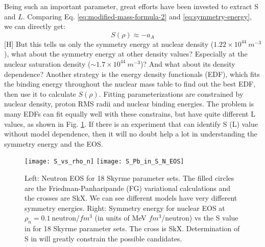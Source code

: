 Being such an important parameter, great efforts have been invested to extract S 
and $L$. Comparing Eq. \ref{eq:modified-mass-formula-2} and \ref{eq:symmetry-energy},
we can directly get:
\begin{equation}
    S(\rho) \approx -a_A
\end{equation}[H]
But this tells us only the symmetry energy at nuclear density ($1.22 \times 10^{44}\ m^{-3}$),
what about the symmetry energy at other density values? Especially at the nuclear
saturation density ($\sim 1.7 \times 10^{44}\ m^{-3}$)? And what about its density
dependence? Another strategy is the energy density functionals (EDF), which fits
the binding energy throughout the nuclear mass table to find out the best EDF,
then use it to calculate $S(\rho)$. Fitting parameterizations are constrained
by nuclear density, proton RMS radii and nuclear binding energies. 
The problem is many EDFs can fit equally well with these constrains, but have quite 
different L values, as shown in Fig. \ref{fig:neutron_EOS}.
If there is an experiment that can identify S (L) value without model dependence, 
then it will no doubt help a lot in understanding the symmetry energy and the EOS.
\begin{figure}[H]
    \texttt{[image: S\_vs\_rho\_n]}
    \hfill
    \texttt{[image: S\_Pb\_in\_S\_N\_EOS]}
    \caption{Left: Neutron EOS for 18 Skyrme parameter sets. The filled circles are
    the Friedman-Panharipande (FG) variational calculations and the crosses are SkX. 
    \cite{PhysRevSTAB.7.042802}
    We can see different models have very different symmetry energies.
    Right: Symmetry energy for nuclear EOS at $\rho_n = 0.1 \ \text{neutron}/fm^3$
    (in units of MeV $fm^3$/neutron) vs the S value in \Pb for 18 Skyrme parameter sets. 
    The cross is SkX. Determination of S in \Pb will greatly constrain the 
    possible candidates.
    }
    \label{fig:neutron_EOS}
\end{figure}


